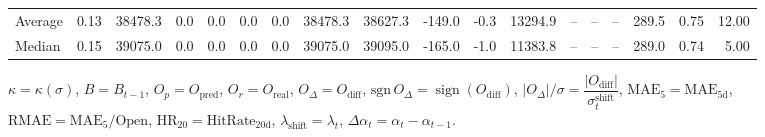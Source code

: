 \begin{threeparttable}
{\begin{tabular}{lrrrrrrrrrrrrrrrrr}
Average &     0.13 & 38478.3 &               0.0 &               0.0 &                0.0 &                0.0 & 38478.3 & 38627.3 &     -149.0 &                     -0.3 &             13294.9 &         -- &        -- &             -- &            289.5 &            0.75 &                  12.00 \\
 Median &     0.15 & 39075.0 &               0.0 &               0.0 &                0.0 &                0.0 & 39075.0 & 39095.0 &     -165.0 &                     -1.0 &             11383.8 &         -- &        -- &             -- &            289.0 &            0.74 &                   5.00 \\
\bottomrule
\end{tabular}
}
\begin{tablenotes}\footnotesize
\item $\kappa=\kappa(\sigma)$, $B=B_{t-1}$, $O_p=O_{\text{pred}}$, $O_r=O_{\text{real}}$, $O_\Delta=O_{\text{diff}}$, $\mathrm{sgn}\,O_\Delta=\operatorname{sign}(O_{\text{diff}})$, $|O_\Delta|/\sigma=\dfrac{|O_{\text{diff}}|}{\sigma_t^{\text{shift}}}$, $\mathrm{MAE}_5=\mathrm{MAE}_{5\text{d}}$, $\mathrm{RMAE}= \mathrm{MAE}_5 / \text{Open}$, $\mathrm{HR}_{20}=\mathrm{HitRate}_{20\text{d}}$, 
$\lambda_{\text{shift}}=\lambda_t$, 
$\Delta\alpha_t=\alpha_t-\alpha_{t-1}$.
\end{tablenotes}
\end{threeparttable}
\endgroup

